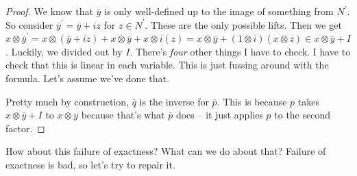 \begin{enumerate}
\begin{proof}
We know that $\overline{y}$ is only well-defined up to the image of something from $N^\prime$. So consider $\overline{y}^\prime=\overline{y}+iz$ for $z\in N^\prime$. These are the only possible lifts. Then we get $x\otimes\overline{y}^\prime=x\otimes(\overline{y}+iz)+x\otimes\overline{y}+x\otimes i(z)=x\otimes\overline{y}+(1\otimes i)(x\otimes z)\in x\otimes\overline{y}+I$. Luckily, we divided out by $I$. There's \emph{four} other things I have to check. I have to check that this is linear in each variable. This is just fussing around with the formula. Let's assume we've done that.

Pretty much by construction, $\overline{q}$ is the inverse for $\overline{p}$. This is because $p$ takes $x\otimes\overline{y}+I$ to $x\otimes y$ because that's what $\overline{p}$ does -- it just applies $p$ to the second factor. 
\end{proof}
\end{enumerate}
How about this failure of exactness? What can we do about that? Failure of exactness is bad, so let's try to repair it.

